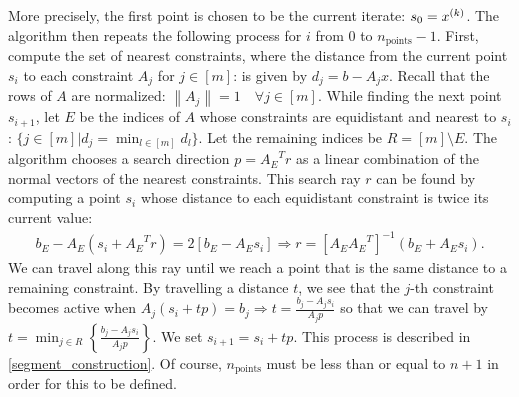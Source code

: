 \documentclass{article}
\begin{document}
More precisely, the first point is chosen to be the current iterate: $s_0 = x^{(k)}$.
The algorithm then repeats the following process for $i$ from $0$ to $n_{\text{points}}-1$.
First, compute the set of nearest constraints, where the distance from the current point $s_i$ to each constraint $A_j$ for $j \in [m]$: 
is given by $d_j = b - A_j x$.
Recall that the rows of $A$ are normalized: $\left\|A_j\right\| = 1 \quad \forall j \in [m]$.
While finding the next point $s_{i+1}$, let  $E$ be the indices of $A$ whose constraints are equidistant and nearest to $s_i$:
$\{j \in [m] | d_j = \min_{l \in [m]} d_l\}$.
Let the remaining indices be $R = [m] \setminus E$.
The algorithm chooses a search direction $p = {A_E}^Tr$ as a linear combination of the normal vectors of the nearest constraints.
This search ray $r$ can be found by computing a point $s_i$ whose distance to each equidistant constraint is twice its current value:
\begin{align*}
b_E - A_E(s_i + {A_E}^Tr) = 2 \left[b_E - A_Es_i\right] \Longrightarrow r = \left[A_E{A_E}^T\right]^{-1}\left(b_E + A_E s_i\right).
\end{align*}
We can travel along this ray until we reach a point that is the same distance to a remaining constraint.
By travelling a distance $t$, we see that the $j$-th constraint becomes active when
$A_j (s_i + t p) = b_j \Longrightarrow t = \frac{b_j - A_j s_i}{A_jp}$
so that we can travel by 
$t = \min_{j \in R} \left\{\frac{b_j - A_j s_i}{A_jp}  \right\}. $
We set $s_{i+1} = s_{i} + t p$.
This process is described in \cref{segment_construction}.
Of course, $n_{\text{points}}$ must be less than or equal to $n + 1$ in order for this to be defined.

\end{document}
